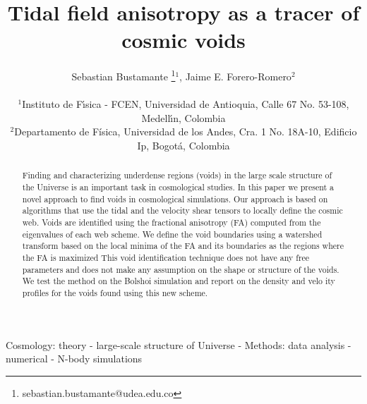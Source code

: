 \documentclass[a4,useAMS,usenatbib,usegraphicx]{latex/mn2e}
\begin{document}
\title{Tidal field anisotropy as a tracer of cosmic voids}
\author[S. Bustamante and J.E. Forero-Romero]{
\parbox[t]{\textwidth}{\raggedright 
  Sebastian Bustamante \thanks{sebastian.bustamante@udea.edu.co}$^{1}$,
  Jaime E. Forero-Romero$^{2}$ 
}
\vspace*{6pt}\\
$^1$Instituto de F\'{\i}sica - FCEN, Universidad de Antioquia, Calle
67 No. 53-108, Medell\'{\i}n, Colombia\\ 
$^2$Departamento de F\'{i}sica, Universidad de los Andes, Cra. 1
No. 18A-10, Edificio Ip, Bogot\'a, Colombia
}

\maketitle

\begin{abstract}
Finding and characterizing underdense regions (voids) in the large
scale structure of the Universe is an important task in cosmological
studies.  
In this paper we present a novel approach to find voids in
cosmological simulations.  
Our approach is based on algorithms that use the tidal and the
velocity shear tensors to locally define the cosmic web.
Voids are identified using the fractional anisotropy (FA) computed
from the eigenvalues of each web scheme. 
We define the void boundaries using a watershed transform based on the
local minima of the FA and its boundaries as the regions where the FA
is maximized
This void identification technique does not have any free parameters
and does not make any assumption on the shape or structure of the
voids.  
We test the method on the Bolshoi simulation and report on the density
and velo ity profiles for the voids found using this new scheme. 
\end{abstract}

\begin{keywords}
Cosmology: theory - large-scale structure of Universe -
Methods: data analysis - numerical - N-body simulations
\end{keywords}



\end{document}
